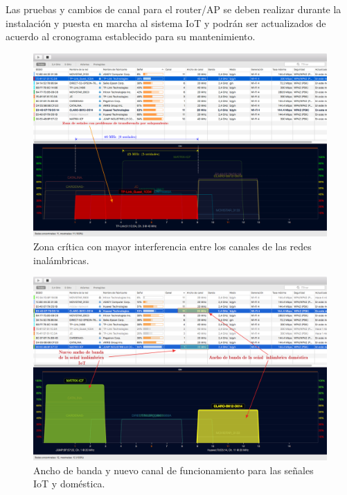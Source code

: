 Las pruebas y cambios de canal para el router/AP se deben realizar durante la instalación y puesta en marcha al sistema IoT y podrán ser actualizados de acuerdo al cronograma establecido para su mantenimiento. 



\begin{landscape} %
\begin{figure}[htpb]
\centering 
\includegraphics[width=1.5\textwidth]{./Figures/wifi/04.png}
\caption{Zona crítica con mayor interferencia entre los canales de las redes inalámbricas.}
\label{fig:test04}
\end{figure}
\end{landscape} %



\begin{landscape} %
\begin{figure}[htpb]
\centering 
\includegraphics[width=1.5\textwidth]{./Figures/wifi/05.png}
\caption{Ancho de banda y nuevo canal de funcionamiento para las señales IoT y doméstica.}
\label{fig:test05}
\end{figure}
\end{landscape} %


